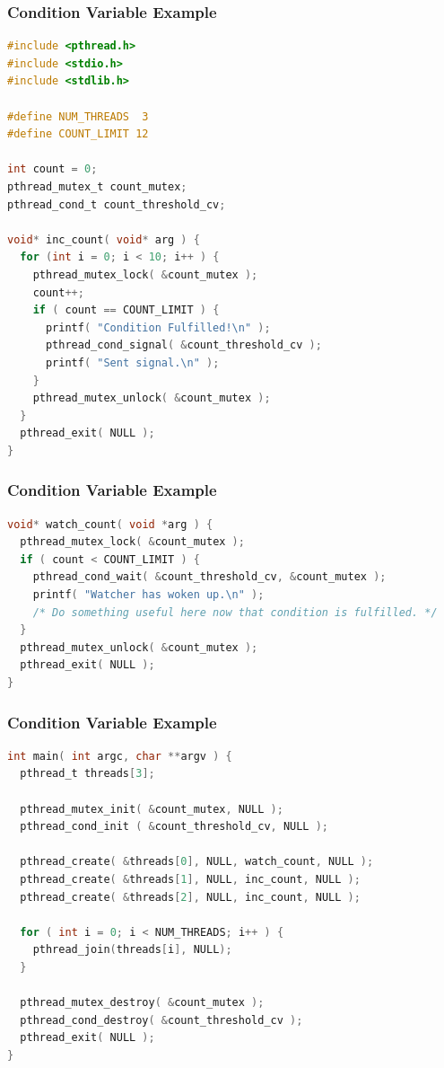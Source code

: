\begin{frame}[fragile]
	\frametitle{Condition Variable Example}

	\begin{lstlisting}[language=C]
#include <pthread.h>
#include <stdio.h>
#include <stdlib.h>

#define NUM_THREADS  3
#define COUNT_LIMIT 12

int count = 0;
pthread_mutex_t count_mutex;
pthread_cond_t count_threshold_cv;

void* inc_count( void* arg ) {
  for (int i = 0; i < 10; i++ ) {
    pthread_mutex_lock( &count_mutex );
    count++;
    if ( count == COUNT_LIMIT ) {
      printf( "Condition Fulfilled!\n" );
      pthread_cond_signal( &count_threshold_cv );
      printf( "Sent signal.\n" );
    }
    pthread_mutex_unlock( &count_mutex );
  }
  pthread_exit( NULL );
}
\end{lstlisting}
\end{frame}

\begin{frame}[fragile]
	\frametitle{Condition Variable Example}

	\begin{lstlisting}[language=C]
void* watch_count( void *arg ) {
  pthread_mutex_lock( &count_mutex );  
  if ( count < COUNT_LIMIT ) {
    pthread_cond_wait( &count_threshold_cv, &count_mutex );
    printf( "Watcher has woken up.\n" );
    /* Do something useful here now that condition is fulfilled. */
  }
  pthread_mutex_unlock( &count_mutex );
  pthread_exit( NULL );
}
\end{lstlisting}
\end{frame}

\begin{frame}[fragile]
	\frametitle{Condition Variable Example}
	\begin{lstlisting}[language=C]
int main( int argc, char **argv ) {
  pthread_t threads[3];

  pthread_mutex_init( &count_mutex, NULL );
  pthread_cond_init ( &count_threshold_cv, NULL );

  pthread_create( &threads[0], NULL, watch_count, NULL );
  pthread_create( &threads[1], NULL, inc_count, NULL );
  pthread_create( &threads[2], NULL, inc_count, NULL );

  for ( int i = 0; i < NUM_THREADS; i++ ) {
    pthread_join(threads[i], NULL);
  }
  
  pthread_mutex_destroy( &count_mutex );
  pthread_cond_destroy( &count_threshold_cv );
  pthread_exit( NULL );
}
\end{lstlisting}
\end{frame}


